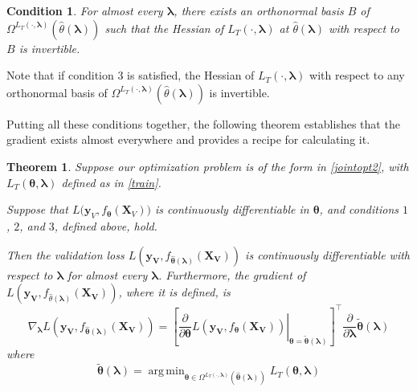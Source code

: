 \documentclass[10pt,letterpaper]{article}
\newtheorem{theorem}{Theorem}
\newtheorem{condition}{Condition}
\DeclareMathOperator*{\argmin}{arg\,min}
\begin{document}
\begin{condition}
For almost every $\boldsymbol{\lambda}$, there exists an orthonormal basis $B$ of $\Omega^{L_T(\cdot, \boldsymbol{\lambda})}(\hat{\theta}\left(\boldsymbol{\lambda}\right))$ such that the Hessian of $L_T\left(\cdot, \boldsymbol{\lambda}\right)$ at $\hat{\theta}\left(\boldsymbol{\lambda}\right)$ with respect to $B$ is invertible.

\end{condition}
Note that if condition 3 is satisfied, the Hessian of $L_T \left(\cdot, \boldsymbol{\lambda}\right)$ with respect to any orthonormal basis of $\Omega^{L_T(\cdot, \boldsymbol{\lambda})}(\hat{\theta}\left(\boldsymbol{\lambda}\right))$ is invertible.

Putting all these conditions together, the following theorem establishes that the gradient exists almost everywhere and provides a recipe for calculating it.

\begin{theorem}
Suppose our optimization problem is of the form in \eqref{jointopt2}, with $L_T\left(\boldsymbol \theta, \boldsymbol{\lambda}\right)$ defined as in \eqref{train}.

Suppose that $L \Big( \boldsymbol{y}_V, f_{\boldsymbol \theta}(\boldsymbol{X}_V)\Big)$ is continuously differentiable in $\boldsymbol \theta$, and conditions $1$, $2$, and $3$, defined above, hold.

Then the validation loss $L(\boldsymbol{y_V}, f_{\hat {\boldsymbol\theta}(\boldsymbol{\lambda})}(\boldsymbol{X_V}))$ is continuously differentiable with respect to $\boldsymbol{\lambda}$ for almost every $\boldsymbol{\lambda}$. Furthermore, the gradient of $L(\boldsymbol{y_V}, f_{\hat \theta(\boldsymbol{\lambda})}(\boldsymbol{X_V}))$, where it is defined, is
\begin{equation}
\nabla_{\boldsymbol{\lambda}} L \left ( \boldsymbol{y_V}, f_{\hat {\boldsymbol \theta}(\boldsymbol{\lambda})}(\boldsymbol{X_V}) \right) =
\left [ \left .
\frac{\partial}{\partial \boldsymbol \theta} L(\boldsymbol{y_V}, f_{\boldsymbol \theta}(\boldsymbol{X_V}))
\right |_{\boldsymbol \theta=\tilde{\boldsymbol \theta}(\boldsymbol \lambda)} \right ]^\top
\frac{\partial}{\partial \boldsymbol{\lambda}} \tilde{\boldsymbol \theta}(\boldsymbol{\lambda})
\end{equation}
where
\begin{equation}
\tilde{\boldsymbol \theta}(\boldsymbol{\lambda}) = \argmin_{\boldsymbol \theta \in \Omega^{L_T(\cdot, \boldsymbol{\lambda})}(\hat {\boldsymbol \theta}(\boldsymbol{\lambda}))} L_T(\boldsymbol \theta , \boldsymbol{\lambda})
\label{restrictedmodelparams}
\end{equation}
\label{thethrm}
\end{theorem}
\end{document}

